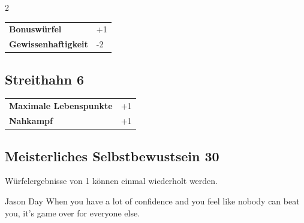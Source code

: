 \begin{multicols}{2}
\begin{tcolorbox}
\vspace{3mm}

\begin{tabular}{@{}ll@{}}
    \textbf{Bonuswürfel} & +1\\
    \textbf{Gewissenhaftigkeit} & -2\\
\end{tabular}


\end{tcolorbox}

\begin{tcolorbox}
    \subsection*{Streithahn \hfill \small{6 }}
    \tcblower




\begin{tabular}{@{}ll@{}}
    \textbf{Maximale Lebenspunkte} & +1\\
    \textbf{Nahkampf} & +1\\
\end{tabular}


\end{tcolorbox}

\begin{tcolorbox}
    \subsection*{Meisterliches Selbstbewustsein \hfill \small{30 }}
    \tcblower
Würfelergebnisse von 1 können einmal wiederholt werden.

\begin{pquote}{Jason Day}
When you have a lot of confidence and you feel like nobody can beat you, it’s game over for everyone else.
\end{pquote}

\vspace{3mm}




\end{tcolorbox}
\end{multicols}
